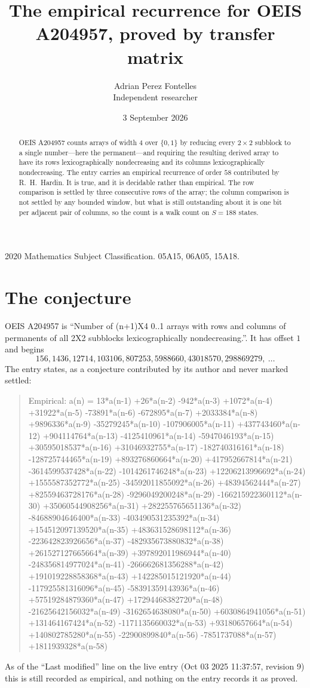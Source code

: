\documentclass[11pt,a4paper]{article}
\title{The empirical recurrence for OEIS A204957, proved by transfer matrix}
\author{Adrian Perez Fontelles\\ \small Independent researcher}
\date{3 September 2026}
\theoremstyle{plain}
\theoremstyle{definition}
\begin{document}
\maketitle

\begin{abstract}
OEIS A204957 counts arrays of width $4$ over $\{0,1\}$ by reducing every $2\times2$ subblock to a
single number---here the permanent---and requiring the resulting derived array to have its rows
lexicographically nondecreasing and its columns lexicographically nondecreasing. The entry carries an
empirical recurrence of order $58$ contributed by R.~H.~Hardin. It is true, and it is
decidable rather than empirical. The row comparison is settled by three consecutive rows of the
array; the column comparison is not settled by any bounded window, but what is still outstanding
about it is one bit per adjacent pair of columns, so the count is a walk count on $S=188$
states.
\end{abstract}

\noindent\small 2020 Mathematics Subject Classification. 05A15, 06A05, 15A18.\normalsize

\section{The conjecture}

OEIS A204957 is ``Number of (n+1)X4 0..1 arrays with rows and columns of permanents of all 2X2 subblocks lexicographically nondecreasing.''. It has offset $1$ and begins
\[
156, 1436, 12714, 103106, 807253, 5988660, 43018570, 298869279,\ \dots
\]
The entry states, as a conjecture contributed by its author and never marked settled:
\begin{quote}
Empirical: a(n) = 13*a(n-1) +26*a(n-2) -942*a(n-3) +1072*a(n-4) +31922*a(n-5) -73891*a(n-6) -672895*a(n-7) +2033384*a(n-8) +9896336*a(n-9) -35279245*a(n-10) -107906005*a(n-11) +437743460*a(n-12) +904114764*a(n-13) -4125410961*a(n-14) -5947046193*a(n-15) +30595018537*a(n-16) +31046932755*a(n-17) -182740316161*a(n-18) -128725744465*a(n-19) +893276860664*a(n-20) +417952667814*a(n-21) -3614599537428*a(n-22) -1014261746248*a(n-23) +12206213996692*a(n-24) +1555587352772*a(n-25) -34592011855092*a(n-26) +48394562444*a(n-27) +82559463728176*a(n-28) -9296049200248*a(n-29) -166215922360112*a(n-30) +35060544908256*a(n-31) +282255765651136*a(n-32) -84688904646400*a(n-33) -403490531235392*a(n-34) +154512097139520*a(n-35) +483631528698112*a(n-36) -223642823926656*a(n-37) -482935673880832*a(n-38) +261527127665664*a(n-39) +397892011986944*a(n-40) -248356814977024*a(n-41) -266662681356288*a(n-42) +191019228858368*a(n-43) +142285015121920*a(n-44) -117925581316096*a(n-45) -58391359143936*a(n-46) +57519284879360*a(n-47) +17294468382720*a(n-48) -21625642156032*a(n-49) -3162654638080*a(n-50) +6030864941056*a(n-51) +131464167424*a(n-52) -1171135660032*a(n-53) +93180657664*a(n-54) +140802785280*a(n-55) -22900899840*a(n-56) -7851737088*a(n-57) +1811939328*a(n-58)
\end{quote}
As of the ``Last modified'' line on the live entry (Oct 03 2025 11:37:57, revision 9) this is still
recorded as empirical, and nothing on the entry records it as proved.
\end{document}
